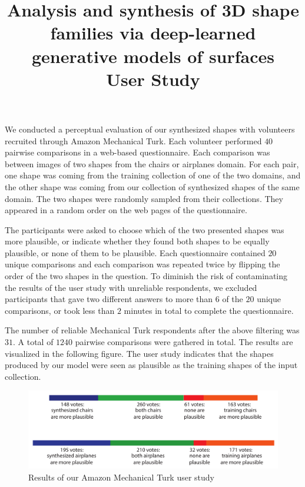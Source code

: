 \documentclass[11pt,a4paper]{article}
\date{}
\begin{document}
\title {Analysis and synthesis of 3D shape families via deep-learned generative models of surfaces \\ User Study}
\maketitle

We conducted a perceptual evaluation of our synthesized shapes with volunteers recruited through Amazon Mechanical Turk. Each volunteer performed $40$ pairwise comparisons in a web-based questionnaire. Each comparison was between images of two shapes from the chairs or airplanes domain. For each pair, one shape was coming from the training collection of one of the two domains, and the other shape was coming from our collection of synthesized shapes of the same domain. The two shapes were randomly sampled from their collections. They appeared in a random order on the web pages of the questionnaire. 

The participants were asked to choose which of the two presented shapes was more plausible, or indicate whether they found both shapes to be equally plausible, or none of them to be plausible. Each questionnaire contained $20$ unique comparisons and each comparison was repeated twice by flipping the order of the two shapes in the question. To diminish the risk of contaminating the results of the user study with unreliable respondents, we excluded participants that gave two different answers to more than $6$ of the $20$ unique comparisons, or took less than $2$ minutes in total to complete the questionnaire. 

The number of reliable Mechanical Turk respondents after the above filtering was $31$. A total of $1240$ pairwise comparisons were gathered in total. The results are visualized in the following figure. The user study indicates that the shapes produced by our model were seen as plausible as the training shapes of the input collection. 

\begin{figure}[h!]
\centering
\includegraphics[width=1.0\textwidth]{figures/user_study}
\caption{Results of our Amazon Mechanical Turk user study}
\end{figure}
\end{document}
